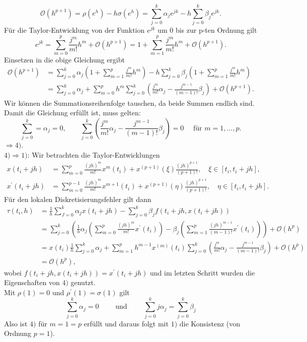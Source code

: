 \[
    \mathcal{O}(h^{p+1}) = \rho(e^h) - h \sigma(e^h) = \sum_{j=0}^{k} \alpha_j e^{jk} - h \sum_{j=0}^{k} \beta_j e^{jk}.
\]
Für die Taylor-Entwicklung von der Funktion $e^{jk}$ um $0$ bis zur p-ten Ordnung gilt
\[
    e^{jk} = \sum_{m=0}^{p} \frac{j^m}{m!}h^m + \mathcal{O}(h^{p+1})
    = 1 + \sum_{m=1}^{p} \frac{j^m}{m!}h^m + \mathcal{O}(h^{p+1}).
\]
Einsetzen in die obige Gleichung ergibt
\begin{align*}
    \mathcal{O}(h^{p+1})
    &= \sum_{j=0}^{k} \alpha_j  \left( 1 + \sum_{m=1}^{p} \frac{j^m}{m!}h^m \right)
    - h \sum_{j=0}^{k} \beta_j  \left( 1 + \sum_{m=1}^{p} \frac{j^m}{m!}h^m \right) \\
    &= \sum_{j=0}^{k}\alpha_j + \sum_{m=0}^{p} h^{m} \sum_{j=0}^{k}
    \left( \frac{j^m}{m!} \alpha_j - \frac{j^{m-1}}{(m-1)!}\beta_j \right) + \mathcal{O}(h^{p+1}).
\end{align*}
Wir können die Summationsreihenfolge tauschen, da beide Summen endlich sind. Damit die Gleichung erfüllt ist, muss
gelten:
\[
    \sum_{j=0}^{k} = \alpha_j = 0, \qquad
    \sum_{j=0}^{k} \left( \frac{j^m}{m!}\alpha_j - \frac{j^{m-1}}{(m-1)!}\beta_j \right) = 0 \quad
    \text{ für } m = 1, \dots, p.
\]
$\Rightarrow 4)$.\\
$4) \Rightarrow 1)$: Wir betrachten die Taylor-Entwicklungen
\begin{align*}
    x(t_i + jh) &= \sum_{m=0}^{p} \frac{(jh)^m}{m!}x^{m}(t_i) + x^{(p+1)}(\xi)\frac{(jh)^{p+1}}{(p+1)!}, \quad
    \xi \in [t_i, t_i + jh], \\
    x^{\prime}(t_i + jh) &= \sum_{m=0}^{p-1} \frac{(jh)^m}{m!}x^{m+1}(t_i) + x^{(p+1)}(\eta)\frac{(jh)^{p+1}}{(p+1)!},
    \quad \eta \in [t_i, t_i + jh].
\end{align*}
Für den lokalen Diskretisierungsfehler gilt dann
\begin{align*}
    \tau(t_i,h) &= \frac{1}{h} \sum_{J=0}^{k} \alpha_j x(t_i + jh) - \sum_{j=0}^{k} \beta_j f(t_i+jh,x(t_i+jh))\\
    &= \sum_{j=0}^{k}\left( \frac{1}{h}\alpha_j \left( \sum_{m=0}^{p} \frac{(jh)^m}{m!}x^{\prime}(t_i)  \right)
    - \beta_j \left( \sum_{m=1}^{p} \frac{(jh)^{m-1}}{(m-1)!}x^{\prime}(t_i) \right) \right) + \mathcal{O}(h^p) \\
    &= x(t_i) \frac{1}{h} \sum_{j=0}^{k} \alpha_j + \sum_{m=1}^{p} h^{m-1} x^{(m
    )}(t_i)
    \sum_{j=0}^{k}\left( \frac{j^m}{m!} \alpha_j - \frac{j^{m-1}}{(m-1)!} \beta_j \right) + \mathcal{O}(h^p)\\
    &= \mathcal{O}(h^p),
\end{align*}
wobei $f(t_i+jh,x(t_i+jh)) = x^{\prime}(t_i+jh)$ und im letzten Schritt wurden die Eigenschaften von $4)$ genutzt.\\
Mit $\rho(1) = 0$ und $\rho^{\prime}(1)=\sigma(1)$ gilt
\[
    \sum_{j=0}^{k} \alpha_j = 0 \qquad \text{ und } \qquad \sum_{j=0}^{k} j \alpha_j = \sum_{j=0}^{k} \beta_j
\]
Also ist $4)$ für $m=1=p$ erfüllt und daraus folgt mit $1)$ die Konsistenz (von Ordnung $p=1$). \qedwhite


